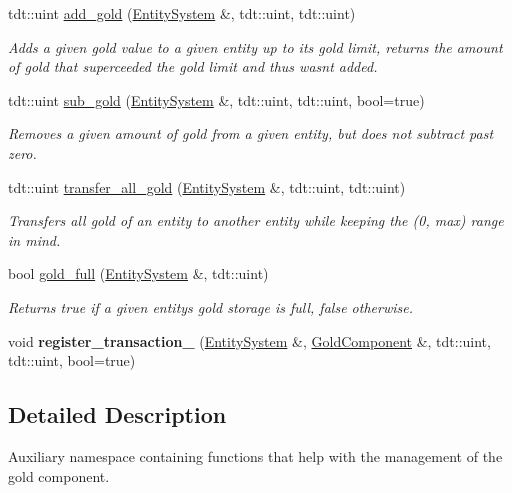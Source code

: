 \begin{DoxyCompactItemize}
tdt\+::uint \hyperlink{namespace_gold_helper_a6822dbb7c34a8864adb6e98c0365ddbf}{add\+\_\+gold} (\hyperlink{class_entity_system}{Entity\+System} \&, tdt\+::uint, tdt\+::uint)
\begin{DoxyCompactList}\small\item\em Adds a given gold value to a given entity up to it\textquotesingle{}s gold limit, returns the amount of gold that superceeded the gold limit and thus wasn\textquotesingle{}t added. \end{DoxyCompactList}\item 
tdt\+::uint \hyperlink{namespace_gold_helper_afed4065de2413c093f823034d0176a77}{sub\+\_\+gold} (\hyperlink{class_entity_system}{Entity\+System} \&, tdt\+::uint, tdt\+::uint, bool=true)
\begin{DoxyCompactList}\small\item\em Removes a given amount of gold from a given entity, but does not subtract past zero. \end{DoxyCompactList}\item 
tdt\+::uint \hyperlink{namespace_gold_helper_ad6046423f1027a1117f52152cc892a5e}{transfer\+\_\+all\+\_\+gold} (\hyperlink{class_entity_system}{Entity\+System} \&, tdt\+::uint, tdt\+::uint)
\begin{DoxyCompactList}\small\item\em Transfers all gold of an entity to another entity while keeping the (0, max) range in mind. \end{DoxyCompactList}\item 
bool \hyperlink{namespace_gold_helper_a37dcb7b18baac8d07d5e844f7be51ad9}{gold\+\_\+full} (\hyperlink{class_entity_system}{Entity\+System} \&, tdt\+::uint)
\begin{DoxyCompactList}\small\item\em Returns true if a given entity\textquotesingle{}s gold storage is full, false otherwise. \end{DoxyCompactList}\item 
void {\bfseries register\+\_\+transaction\+\_\+} (\hyperlink{class_entity_system}{Entity\+System} \&, \hyperlink{struct_gold_component}{Gold\+Component} \&, tdt\+::uint, tdt\+::uint, bool=true)\hypertarget{namespace_gold_helper_ae4891dda5b43cf756bcfd501380485ea}{}\label{namespace_gold_helper_ae4891dda5b43cf756bcfd501380485ea}

\end{DoxyCompactItemize}


\subsection{Detailed Description}
Auxiliary namespace containing functions that help with the management of the gold component. 

